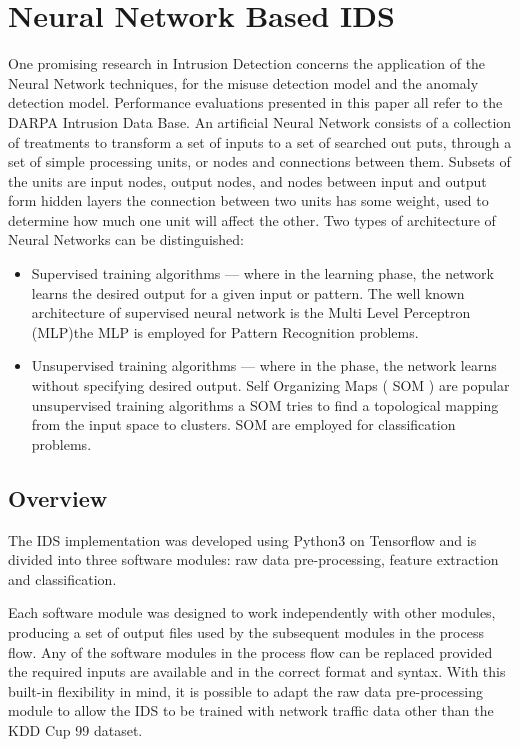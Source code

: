 \documentclass[12pt]{article}
\theoremstyle{definition}
\begin{document}
	
	\cleardoublepage
	\section{Neural Network Based IDS}\label{sec:nn-based-ids}
		One promising research in Intrusion Detection concerns the application of the Neural Network techniques, for the misuse detection model and the anomaly detection model. Performance evaluations presented in this
		paper all refer to the DARPA Intrusion Data Base.
		An artificial Neural Network consists of a collection of treatments to transform a set of inputs to a set of searched out puts, through a set of simple processing
		units, or nodes and connections between them. Subsets of the units are input nodes, output nodes, and nodes
		between input and output form hidden layers the connection between two units has some weight, used to determine how much one unit will affect the other. Two types of architecture of Neural Networks can be distinguished:
		\begin{itemize}
			\item Supervised training algorithms --- where in the learning 
			phase, the network learns the desired output for a given input or pattern. The well known architecture of supervised neural network is the Multi Level Perceptron (MLP)the MLP is employed for Pattern 
			Recognition problems.
			\item Unsupervised training algorithms --- where in the phase, the network learns without specifying desired output. Self Organizing Maps ( SOM ) are popular unsupervised training algorithms a SOM tries to find a topological mapping from the input space to clusters. SOM are employed for classification problems.
		\end{itemize}
		
		\subsection{Overview}
		The IDS implementation was developed using Python3 on Tensorflow and is divided
		into three software modules: raw data pre-processing, feature extraction and classification.
		
		Each software module was designed to work independently with other modules,
		producing a set of output files used by the subsequent modules in the process flow. Any of the software modules in the process flow can be replaced provided the required inputs are available and in the correct format and syntax. With this built-in flexibility in mind, it is possible to adapt the raw data pre-processing module to allow the IDS to be trained with network traffic data other than the KDD Cup 99 dataset.
		
\end{document}
